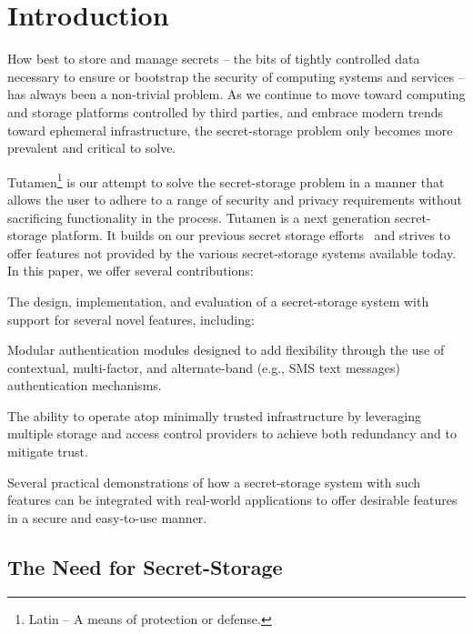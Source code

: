 \section{Introduction}
\label{sec:intro}

How best to store and manage secrets -- the bits of tightly controlled
data necessary to ensure or bootstrap the security of computing
systems and services -- has always been a non-trivial problem. As we
continue to move toward computing and storage platforms controlled by
third parties, and embrace modern trends toward ephemeral
infrastructure, the secret-storage problem only becomes more prevalent
and critical to solve.

Tutamen\footnote{Latin -- A means of protection or defense.} is our
attempt to solve the secret-storage problem in a manner that allows
the user to adhere to a range of security and privacy requirements
without sacrificing functionality in the process. Tutamen is a next
generation secret-storage platform. It builds on our previous secret
storage efforts~\cite{custos-trios} and strives to offer features not
provided by the various secret-storage systems available today. In
this paper, we offer several contributions:

\begin{packed_item}
\item The design, implementation, and evaluation of a secret-storage
  system with support for several novel features, including:
  \begin{packed_item}
  \item Modular authentication modules designed to add flexibility
    through the use of contextual, multi-factor, and alternate-band
    (e.g., SMS text messages) authentication mechanisms.
  \item The ability to operate atop minimally trusted infrastructure
    by leveraging multiple storage and access control providers to
    achieve both redundancy and to mitigate trust.
  \end{packed_item}
\item Several practical demonstrations of how a secret-storage system
  with such features can be integrated with real-world applications to
  offer desirable features in a secure and easy-to-use manner.
\end{packed_item}

\subsection{The Need for Secret-Storage}

